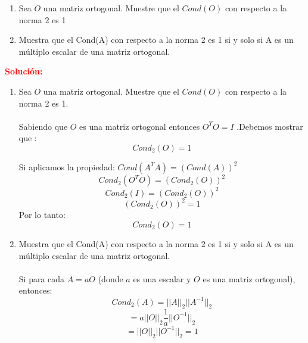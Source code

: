 
 \begin{enumerate}[label=(\alph*)]
	\item Sea $O$ una matriz ortogonal. Muestre que el $Cond(O)$ con respecto a la norma 2 es 1
	\item Muestra que el Cond(A) con respecto a la norma 2 es 1 si y solo si A es un múltiplo escalar de una matriz ortogonal.
	
   
\end{enumerate}
\noindent \textcolor{red}{\bf Solución:}
\begin{enumerate}[label=(\alph*)]
    
    \item Sea $O$ una matriz ortogonal. Muestre que el $Cond(O)$ con respecto a la norma 2 es 1. \\\\
    Sabiendo que $O$ es una matriz ortogonal entonces $O^T O = I$ .Debemos mostrar que :
    $$Cond_2(O) = 1$$
    
    Si aplicamos la propiedad: $Cond(A^{T} A)=(Cond(A))^2$\\
    $$Cond_2(O^T O) = (Cond_2(O))^2$$
    $$ Cond_2(I)=(Cond_2(O))^2$$
    $$(Cond_2(O))^2=1 $$
    Por lo tanto:
    $$Cond_2(O) = 1$$
    
	\item Muestra que el Cond(A) con respecto a la norma 2 es 1 si y solo si A es un múltiplo escalar de una matriz ortogonal.
	\\\\
	
	Si para cada $A = aO$ (donde $a$ es una escalar y $O$ es una matriz ortogonal), entonces:
	$$Cond_2(A) = ||A||_2||A^{-1}||_2$$ 
	$$ = a||O||_2\frac{1}{a}||O^{-1}||_2 $$
	$$= ||O||_2||O^{-1}||_2 = 1$$

\end{enumerate}
